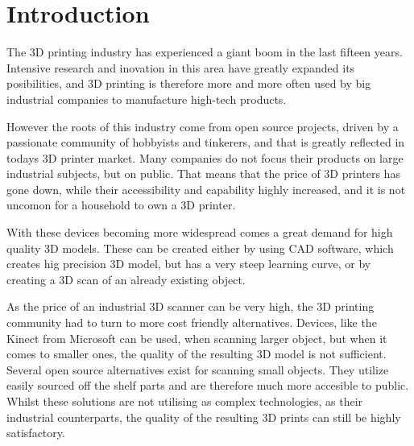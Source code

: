 \chapter{Introduction}
\label{sec:Introduction}
The 3D printing industry has experienced a giant boom in the last fifteen years.
Intensive research and inovation in this area have greatly expanded its posibilities, and 3D printing is therefore more and more often used by big industrial companies to manufacture high-tech products.

However the roots of this industry come from open source projects, driven by a passionate community of hobbyists and tinkerers, and that is greatly reflected in todays 3D printer market.
Many companies do not focus their products on large industrial subjects, but on public. That means that the price of 3D printers has gone down, while their accessibility and capability highly increased, and it is not uncomon for a household to own a 3D printer.

With these devices becoming more widespread comes a great demand for high quality 3D models.
These can be created either by using CAD software, which creates hig precision 3D model, but has a very steep learning curve, or by creating a 3D scan of an already existing object.

As the price of an industrial 3D scanner can be very high, the 3D printing community had to turn to more cost friendly alternatives.
Devices, like the Kinect from Microsoft can be used, when scanning larger object, but when it comes to smaller ones, the quality of the resulting 3D model is not sufficient.
Several open source alternatives exist for scanning small objects.
They utilize easily sourced off the shelf parts and are therefore much more accesible to public.
Whilst these solutions are not utilising as complex technologies, as their industrial counterparts, the quality of the resulting 3D prints can still be highly satisfactory.



\endinput